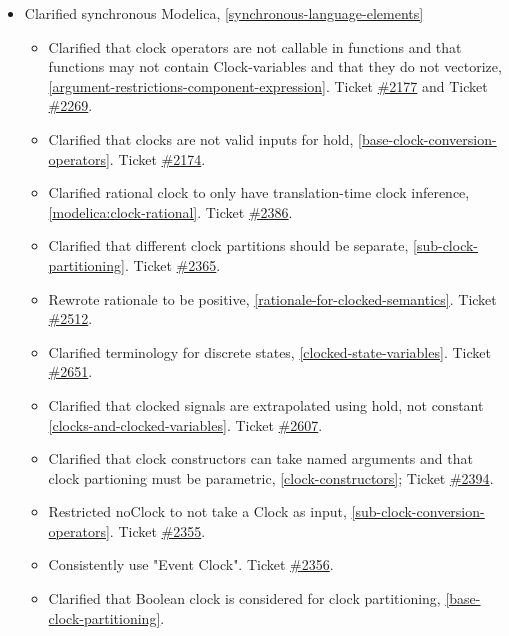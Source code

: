 \begin{itemize}
\item Clarified synchronous Modelica, \cref{synchronous-language-elements}
\begin{itemize}
\item Clarified that clock operators are not callable in functions and that functions may not contain Clock-variables and that they do not vectorize, \cref{argument-restrictions-component-expression}.
Ticket \href{https://github.com/modelica/ModelicaSpecification/issues/2177}{\#2177} and Ticket \href{https://github.com/modelica/ModelicaSpecification/issues/2269}{\#2269}.
\item Clarified that clocks are not valid inputs for hold, \cref{base-clock-conversion-operators}.
Ticket \href{https://github.com/modelica/ModelicaSpecification/issues/2174}{\#2174}.
\item Clarified rational clock to only have translation-time clock inference, \cref{modelica:clock-rational}.
Ticket \href{https://github.com/modelica/ModelicaSpecification/issues/2386}{\#2386}.
\item Clarified that different clock partitions should be separate, \cref{sub-clock-partitioning}.
Ticket \href{https://github.com/modelica/ModelicaSpecification/issues/2365}{\#2365}.
\item Rewrote rationale to be positive, \cref{rationale-for-clocked-semantics}.
Ticket \href{https://github.com/modelica/ModelicaSpecification/issues/2512}{\#2512}.
\item Clarified terminology for discrete states, \cref{clocked-state-variables}.
Ticket \href{https://github.com/modelica/ModelicaSpecification/issues/2651}{\#2651}.
\item Clarified that clocked signals are extrapolated using hold, not constant \cref{clocks-and-clocked-variables}.
Ticket \href{https://github.com/modelica/ModelicaSpecification/pull/2607}{\#2607}.
\item Clarified that clock constructors can take named arguments and that clock partioning must be parametric, \cref{clock-constructors};
Ticket \href{https://github.com/modelica/ModelicaSpecification/pull/2394}{\#2394}.
\item Restricted noClock to not take a Clock as input, \cref{sub-clock-conversion-operators}.
Ticket \href{https://github.com/modelica/ModelicaSpecification/issues/2355}{\#2355}.
\item Consistently use "Event Clock".
Ticket \href{https://github.com/modelica/ModelicaSpecification/issues/2356}{\#2356}.
\item Clarified that Boolean clock is considered for clock partitioning, \cref{base-clock-partitioning}.

\end{itemize}
\end{itemize}
